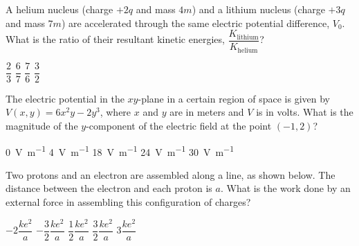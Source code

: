 \documentclass[12pt]{../../oss-classkick-exam}
\begin{document}
\begin{questions}
  \question A helium nucleus (charge $+2q$ and mass $4m$) and a lithium nucleus
  (charge $+3q$ and mass $7m$) are accelerated through the same electric
  potential difference, $V_0$. What is the ratio of their resultant
  kinetic energies, $\dfrac{K_\text{lithium}}{K_\text{helium}}$?

  \begin{oneparchoices}
    \choice$\dfrac23$\hspace{.4in}
    \choice$\dfrac67$\hspace{.4in}
    \hspace{.4in}
    \choice$\dfrac76$\hspace{.4in}
    \choice$\dfrac32$
  \end{oneparchoices}
  \vspace{.15in}

  \uplevel{ \rule{\linewidth}{.5pt}}
  
  \question The electric potential in the $xy$-plane in a certain region of
  space is given by $V(x,y)=6x^2y-2y^3$, where $x$ and $y$ are in meters and
  $V$ is in volts. What is the magnitude of the $y$-component of the electric
  field at the point $(-1,2)$?
  \begin{choices}
    \choice\SI{0}{\volt\per\metre}
    \choice\SI{4}{\volt\per\metre}
    \choice\SI{18}{\volt\per\metre}
    \choice\SI{24}{\volt\per\metre}
    \choice\SI{30}{\volt\per\metre}
  \end{choices}


  \question Two protons and an electron are assembled along a line, as shown
  below. The distance between the electron and each proton is $a$. What is the
  work done by an external force in assembling this configuration of charges?

  \begin{oneparchoices}
    \choice $-2\dfrac{ke^2}a$\hspace{.15in}
    \choice $-\dfrac32\dfrac{ke^2}a$\hspace{.15in}
    \choice $\dfrac12\dfrac{ke^2}a$\hspace{.15in}
    \choice $\dfrac32\dfrac{ke^2}a$\hspace{.15in}
    \choice $3\dfrac{ke^2}a$
  \end{oneparchoices}


\end{questions}
\end{document}
